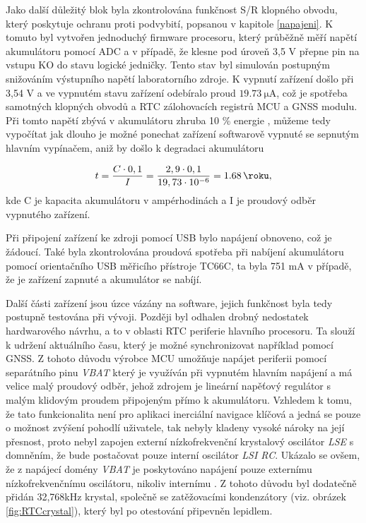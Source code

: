 Jako další důležitý blok byla zkontrolována funkčnost S/R klopného obvodu, který poskytuje ochranu proti podvybití, popsanou v kapitole \ref{napajeni}. K tomuto byl vytvořen jednoduchý firmware procesoru, který průběžně měří napětí akumulátoru pomocí \ac{ADC} a v případě, že klesne pod úroveň 3,5 V přepne pin na vstupu KO do stavu logické jedničky. Tento stav byl simulován postupným snižováním výstupního napětí laboratorního zdroje. K vypnutí zařízení došlo při 3,54 V a ve vypnutém stavu zařízení odebíralo proud $ \SI{19,73}{\micro\ampere} $, což je spotřeba samotných klopných obvodů a \ac{RTC} zálohovacích registrů \ac{MCU} a \ac{GNSS} modulu. Při tomto napětí zbývá v akumulátoru zhruba 10 \% energie \cite{Cheruiyot2022914}, můžeme tedy vypočítat jak dlouho je možné ponechat zařízení softwarově vypnuté se sepnutým hlavním vypínačem, aniž by došlo k degradaci akumulátoru

\begin{equation}
t = \dfrac{C\cdot 0,1}{I}=\dfrac{2,9\cdot 0,1}{19,73 \cdot 10^{-6}}= \SI{1.68}{\roku} ,
\end{equation}
kde C je kapacita akumulátoru v ampérhodinách a I je proudový odběr vypnutého zařízení.

Při připojení zařízení ke zdroji pomocí \ac{USB} bylo napájení obnoveno, což je žádoucí. Také byla zkontrolována proudová spotřeba při nabíjení akumulátoru pomocí orientačního \ac{USB} měřicího přístroje TC66C, ta byla 751 mA v případě, že je zařízení zapnuté a akumulátor se nabíjí.

Další části zařízení jsou úzce vázány na software, jejich funkčnost byla tedy postupně testována při vývoji. Později byl odhalen drobný nedostatek hardwarového návrhu, a to v oblasti \ac{RTC} periferie hlavního procesoru. Ta slouží k udržení aktuálního času, který je možné synchronizovat například pomocí \ac{GNSS}. Z tohoto důvodu výrobce \ac{MCU} umožňuje napájet periferii pomocí separátního pinu \emph{VBAT} který je využíván při vypnutém hlavním napájení a má velice malý proudový odběr, jehož zdrojem je lineární napěťový regulátor s malým klidovým proudem připojeným přímo k akumulátoru. Vzhledem k tomu, že tato funkcionalita není pro aplikaci inerciální navigace klíčová a jedná se pouze o možnost zvýšení pohodlí uživatele, tak nebyly kladeny vysoké nároky na její přesnost, proto nebyl zapojen externí nízkofrekvenční krystalový oscilátor \emph{LSE} s domněním, že bude postačovat pouze interní oscilátor \emph{LSI RC}. Ukázalo se ovšem, že z napájecí domény \emph{VBAT} je poskytováno napájení pouze externímu nízkofrekvenčnímu oscilátoru, nikoliv internímu \cite{csdGtKJDMSdbwJ9r}. Z tohoto důvodu byl dodatečně přidán 32,768kHz krystal, společně se zatěžovacími kondenzátory (viz. obrázek \ref{fig:RTCcrystal}), který byl po otestování připevněn lepidlem.



